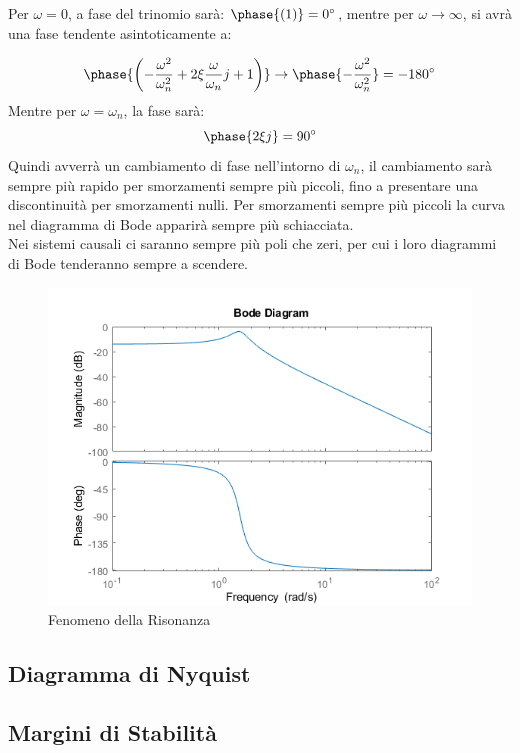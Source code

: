 \documentclass{article}
\numberwithin{equation}{subsection}
\begin{document}
Per $\omega=0$, a fase del trinomio sarà: $\phase{(1)}=0^{\circ}$, mentre per $\omega\to\infty$, si avrà una fase tendente asintoticamente a: 

\begin{equation}
    \phase{\left(-\displaystyle\frac{\omega^2}{\omega_n^2}+2\xi\frac{\omega}{\omega_n}j+1\right)}\to\phase{-\displaystyle\frac{\omega^2}{\omega_n^2}}=-180^{\circ}
\end{equation}
Mentre per $\omega=\omega_n$, la fase sarà: 
\begin{equation}
    \phase{2\xi j}=90^{\circ}
\end{equation}
Quindi avverrà un cambiamento di fase nell'intorno di $\omega_n$, il cambiamento sarà sempre più rapido per smorzamenti sempre più piccoli, fino a presentare una 
discontinuità per smorzamenti nulli. Per smorzamenti sempre più piccoli la curva nel diagramma di Bode apparirà sempre più schiacciata. \\
Nei sistemi causali ci saranno sempre più poli che zeri, per cui i loro diagrammi di Bode tenderanno sempre a scendere. 

\begin{figure}
    \includegraphics{BodeRisonanza}
    \caption{Fenomeno della Risonanza}
\end{figure}

\subsection{Diagramma di Nyquist}



\subsection{Margini di Stabilità}
\end{document}
